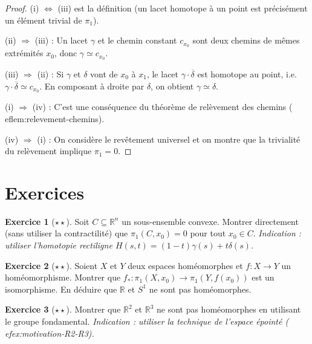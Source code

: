 \documentclass[12pt,a4paper,openany]{book}
\theoremstyle{definition}
\newtheorem{exercice}{Exercice}[chapter]
\theoremstyle{plain}
\theoremstyle{remark}
\newcommand{\R}{\mathbb{R}}
\begin{document}
\begin{proof}
(i) $\Leftrightarrow$ (iii) est la définition (un lacet homotope à un point
est précisément un élément trivial de $\pi_1$).

(ii) $\Rightarrow$ (iii) : Un lacet $\gamma$ et le chemin constant $c_{x_0}$
sont deux chemins de mêmes extrémités $x_0$, donc $\gamma \simeq c_{x_0}$.

(iii) $\Rightarrow$ (ii) : Si $\gamma$ et $\delta$ vont de $x_0$ à $x_1$, le
lacet $\gamma \cdot \overline{\delta}$ est homotope au point, i.e.\
$\gamma \cdot \overline{\delta} \simeq c_{x_0}$. En composant à droite par
$\delta$, on obtient $\gamma \simeq \delta$.

(i) $\Rightarrow$ (iv) : C'est une conséquence du théorème de relèvement des
chemins (
ef{lem:relevement-chemins}).

(iv) $\Rightarrow$ (i) : On considère le revêtement universel et on montre que
la trivialité du relèvement implique $\pi_1 = 0$.
\end{proof}

\section{Exercices}\label{sec:exos-ch2}

\begin{exercice}[$\star\star$]\label{exo:pi1-trivial-convexe}
Soit $C \subseteq \R^n$ un sous-ensemble convexe. Montrer directement (sans
utiliser la contractilité) que $\pi_1(C, x_0) = 0$ pour tout $x_0 \in C$.
\emph{Indication : utiliser l'homotopie rectiligne $H(s,t) = (1-t)\gamma(s) + t\delta(s)$.}
\end{exercice}

\begin{exercice}[$\star\star$]\label{exo:pi1-homeo-invariant}
Soient $X$ et $Y$ deux espaces homéomorphes et $f : X \to Y$ un homéomorphisme.
Montrer que $f_* : \pi_1(X, x_0) \to \pi_1(Y, f(x_0))$ est un isomorphisme.
En déduire que $\R$ et $S^1$ ne sont pas homéomorphes.
\end{exercice}

\begin{exercice}[$\star\star$]\label{exo:R2-R3-non-homeo}
Montrer que $\R^2$ et $\R^3$ ne sont pas homéomorphes en utilisant le groupe
fondamental. \emph{Indication : utiliser la technique de l'espace épointé
(
ef{ex:motivation-R2-R3}).}
\end{exercice}
\end{document}
